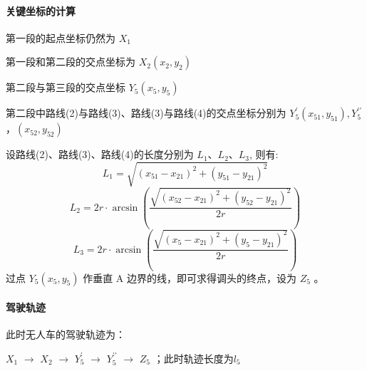 \documentclass{article}
\begin{document}
\paragraph{关键坐标的计算}
\noindent 第一段的起点坐标仍然为 $X_{1}$

\noindent 第一段和第二段的交点坐标为 $X_{2}\left(x_{2}, y_{2}\right)$

\noindent 第二段与第三段的交点坐标 $Y_{5}\left(x_{5}, y_{5}\right)$

\noindent 第二段中路线(2)与路线(3)、路线(3)与路线(4)的交点坐标分别为 $Y_{5}^{\prime}\left(x_{51}, y_{51}\right), Y_{5}^{\prime \prime}$，$\left(x_{52}, y_{52}\right)$

\noindent 设路线(2)、路线(3)、路线(4)的长度分别为 $L_{1} 、 L_{2} 、 L_{3}$, 则有:
\begin{equation}
    L_{1}=\sqrt{\left(x_{51}-x_{21}\right)^{2}+\left(y_{51}-y_{21}\right)^{2}}
\end{equation}
\begin{equation}
    L_{2}=2 r \cdot \arcsin \left(\frac{\sqrt{\left(x_{52}-x_{21}\right)^{2}+\left(y_{52}-y_{21}\right)^{2}}}{2 r}\right)
\end{equation}
\begin{equation}
    L_{3}=2 r \cdot \arcsin \left(\frac{\sqrt{\left(x_{5}-x_{21}\right)^{2}+\left(y_{5}-y_{21}\right)^{2}}}{2 r}\right)
\end{equation}
\noindent 过点 $Y_{5}\left(x_{5}, y_{5}\right)$ 作垂直 $\mathrm{A}$ 边界的线，即可求得调头的终点，设为 $Z_{5}$ 。

\paragraph{驾驶轨迹}
\noindent 此时无人车的驾驶轨迹为：

\noindent $X_{1}$ $\rightarrow $ $X_{2}$ $\rightarrow $ $Y_{5}^{\prime}$ $\rightarrow $ $Y_{5}^{\prime \prime}$ $\rightarrow $ $Z_{5}$ ；此时轨迹长度为$l_5$
\end{document}
